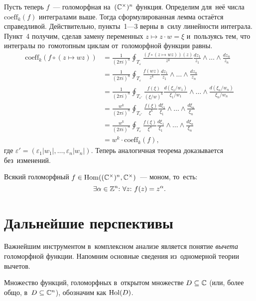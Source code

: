 \documentclass[a4paper,oneside]{article}
\begin{document}
Пусть теперь $f$~— голоморфная на~$(\mathbb{C}^\times)^n$ функция. Определим для~неё числа $\mathrm{coeff}_k(f)$ интегралами выше.
Тогда сформулированная лемма остаётся справедливой. Действительно, пункты~1—3 верны в~силу линейности интеграла.
Пункт~4 получим, сделав замену переменных $z \mapsto z \cdot w = \xi$ и~пользуясь тем, что интегралы
по~гомотопным циклам от~голоморфной функции равны.
\[
\begin{aligned}
  \mathrm{coeff}_k(f \circ (z \mapsto wz)) &= \frac{1}{(2 \pi i)^n} \oint_{T_\varepsilon} \frac{(f \circ (z \mapsto wz))(z)}{z^k} \frac{dz_1}{z_1} \wedge \ldots \wedge \frac{dz_n}{z_n} \\
                                           &= \frac{1}{(2 \pi i)^n} \oint_{T_\varepsilon} \frac{f(wz)}{z^k} \frac{dz_1}{z_1} \wedge \ldots \wedge \frac{dz_n}{z_n} \\
                                           &= \frac{1}{(2 \pi i)^n} \oint_{T_{\varepsilon'}} \frac{f(\xi)}{(\xi / w)^k} \frac{d(\xi_1 / w_1)}{\xi_1 / w_1} \wedge \ldots \wedge \frac{d(\xi_n / w_n)}{\xi_n / w_n} \\
                                           &= \frac{w^k}{(2 \pi i)^n} \oint_{T_{\varepsilon'}} \frac{f(\xi)}{\xi^k} \frac{d\xi_1}{\xi_1} \wedge \ldots \wedge \frac{d\xi_n}{\xi_n} \\
                                           &= \frac{w^k}{(2 \pi i)^n} \oint_{T_{\varepsilon}} \frac{f(\xi)}{\xi^k} \frac{d\xi_1}{\xi_1} \wedge \ldots \wedge \frac{d\xi_n}{\xi_n} \\
                                           &= w^k \cdot \mathrm{coeff}_k(f),
\end{aligned}
\]
где $\varepsilon' = (\varepsilon_1 |w_1|, \ldots, \varepsilon_n |w_n|)$.
Теперь аналогичная теорема доказывается без~изменений.

\begin{theorem*}
  Всякий голоморфный $f \in \mathrm{Hom}((\mathbb{C}^\times)^n, \mathbb{C}^\times)$~— моном, то~есть:
  \[
    \exists \alpha \in \mathbb{Z}^n{:}\ \forall z{:}\ f(z) = z^\alpha.
  \]
\end{theorem*}

\section{Дальнейшие перспективы}
Важнейшим инструментом в~комплексном анализе является понятие \textit{вычета} голоморфной функции.
Напомним основные сведения из~одномерной теории вычетов.

Множество функций, голоморфных в~открытом множестве $D \subseteq \mathbb{C}$ (или, более общо, в~$D \subseteq \mathbb{C}^n$), обозначим как $\mathrm{Hol}(D)$.
\end{document}
